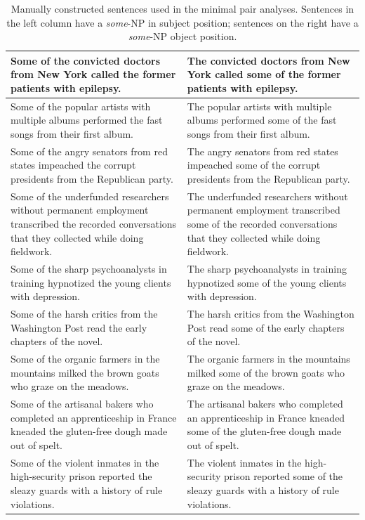 \documentclass[11pt,a4paper]{article}
\begin{document}
\begin{table}[h]
\begin{tabular}{|p{}|p{}|}
        \hline
        Some of the convicted doctors from New York called the former patients with epilepsy. & The convicted doctors from New York called some of the former patients with epilepsy. \\
        \hline
        Some of the popular artists with multiple albums performed the fast songs from their first album. & The popular artists with multiple albums performed some of the fast songs from their first album. \\
        \hline
        Some of the angry senators from red states impeached the corrupt presidents from the Republican party. & The angry senators from red states impeached some of the corrupt presidents from the Republican party. \\
        \hline
        Some of the underfunded researchers without permanent employment transcribed the recorded conversations that they collected while doing fieldwork.  & The underfunded researchers without permanent employment transcribed some of the recorded conversations that they collected while doing fieldwork. \\
        \hline
        Some of the sharp psychoanalysts in training hypnotized the young clients with depression. & The sharp psychoanalysts in training hypnotized some of the young clients with depression. \\
        \hline
        Some of the harsh critics from the Washington Post read the early chapters of the novel. & The harsh critics from the Washington Post read some of the early chapters of the novel. \\
        \hline
       Some of the organic farmers in the mountains milked the brown goats who graze on the meadows. & The organic farmers in the mountains milked some of the brown goats who graze on the meadows. \\
        \hline
        Some of the artisanal bakers who completed an apprenticeship in France kneaded the gluten-free dough made out of spelt. &  The artisanal bakers who completed an apprenticeship in France kneaded some of the gluten-free dough made out of spelt. \\ 
        \hline
        Some of the violent inmates in the high-security prison reported the sleazy guards with a history of rule violations. & The violent inmates in the high-security prison reported some of the sleazy guards with a history of rule violations. \\
       
        \hline
       
    \end{tabular}
    \caption{Manually constructed sentences used in the minimal pair analyses. Sentences in the left column have a \emph{some}-NP in subject position; sentences on the right have a \emph{some}-NP object position.}
    \label{tbl:artificial-sentences-1}
\end{table}
\end{document}
